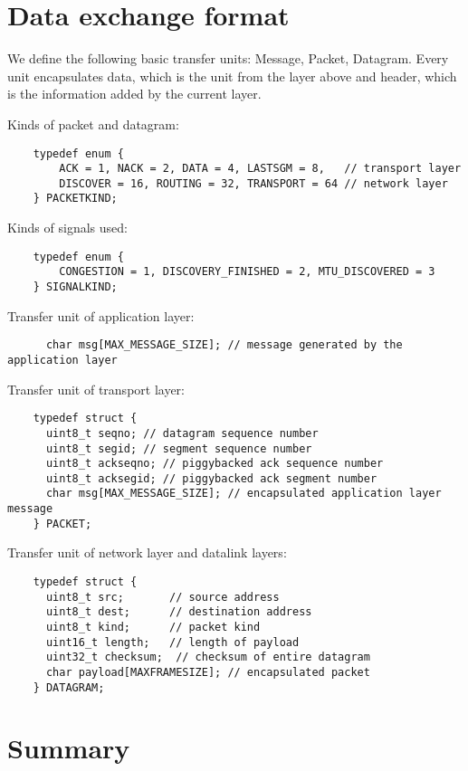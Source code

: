 \documentclass[11pt,a4paper,oneside]{report}
\begin{document}
\section*{Data exchange format}

We define the following basic transfer units: Message, Packet, Datagram.
Every unit encapsulates data, which is the unit from the layer above and header, 
which is the information added by the current layer. 

Kinds of packet and datagram:

    \begin{lstlisting}
    typedef enum {
        ACK = 1, NACK = 2, DATA = 4, LASTSGM = 8,   // transport layer
        DISCOVER = 16, ROUTING = 32, TRANSPORT = 64 // network layer
    } PACKETKIND;
    \end{lstlisting}
    
Kinds of signals used:

    \begin{lstlisting}
    typedef enum {
        CONGESTION = 1, DISCOVERY_FINISHED = 2, MTU_DISCOVERED = 3
    } SIGNALKIND;
    \end{lstlisting}

Transfer unit of application layer:
    \begin{lstlisting}
      char msg[MAX_MESSAGE_SIZE]; // message generated by the application layer
    \end{lstlisting}
  
Transfer unit of transport layer:
       
    \begin{lstlisting}
    typedef struct {
      uint8_t seqno; // datagram sequence number
      uint8_t segid; // segment sequence number
      uint8_t ackseqno; // piggybacked ack sequence number
      uint8_t acksegid; // piggybacked ack segment number
      char msg[MAX_MESSAGE_SIZE]; // encapsulated application layer message
    } PACKET;
    \end{lstlisting}
  
Transfer unit of network layer and datalink layers:   
    
    \begin{lstlisting}
    typedef struct {
      uint8_t src;       // source address
      uint8_t dest;      // destination address
      uint8_t kind;      // packet kind
      uint16_t length;   // length of payload
      uint32_t checksum;  // checksum of entire datagram
      char payload[MAXFRAMESIZE]; // encapsulated packet
    } DATAGRAM;
   \end{lstlisting}
   

\section*{Summary}
\end{document}
